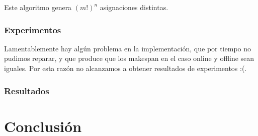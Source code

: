 \documentclass[12pt,letterpaper]{article}
\begin{document}
Este algoritmo genera $(m!)^{n}$ asignaciones distintas.

\subsubsection{Experimentos}
Lamentablemente hay algún problema en la implementación, que por tiempo no pudimos reparar, y que produce que los makespan en el caso online y offline sean iguales. Por esta razón no alcanzamos a obtener resultados de experimentos :(.

\subsubsection{Resultados}

\section{Conclusión}

\end{document}
